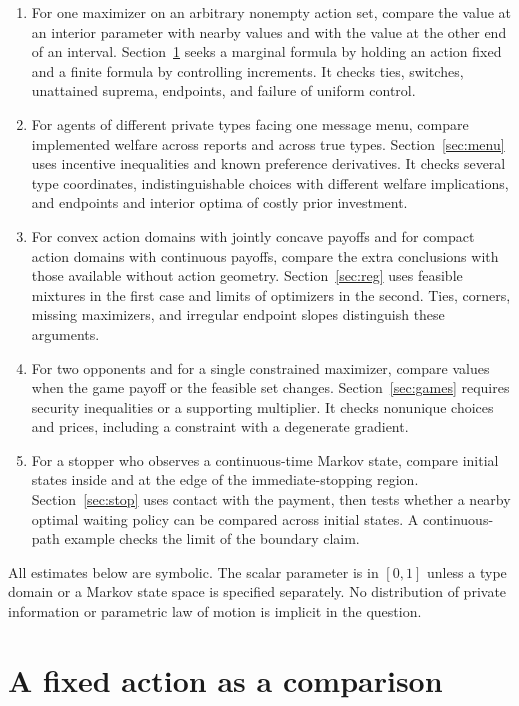 \documentclass[11pt]{article}
\begin{document}
\begin{enumerate}
\item For one maximizer on an arbitrary nonempty action set, compare the value at an interior parameter with nearby values and with the value at the other end of an interval. Section~\ref{sec:base} seeks a marginal formula by holding an action fixed and a finite formula by controlling increments. It checks ties, switches, unattained suprema, endpoints, and failure of uniform control.
\item For agents of different private types facing one message menu, compare implemented welfare across reports and across true types. Section~\ref{sec:menu} uses incentive inequalities and known preference derivatives. It checks several type coordinates, indistinguishable choices with different welfare implications, and endpoints and interior optima of costly prior investment.
\item For convex action domains with jointly concave payoffs and for compact action domains with continuous payoffs, compare the extra conclusions with those available without action geometry. Section~\ref{sec:reg} uses feasible mixtures in the first case and limits of optimizers in the second. Ties, corners, missing maximizers, and irregular endpoint slopes distinguish these arguments.
\item For two opponents and for a single constrained maximizer, compare values when the game payoff or the feasible set changes. Section~\ref{sec:games} requires security inequalities or a supporting multiplier. It checks nonunique choices and prices, including a constraint with a degenerate gradient.
\item For a stopper who observes a continuous-time Markov state, compare initial states inside and at the edge of the immediate-stopping region. Section~\ref{sec:stop} uses contact with the payment, then tests whether a nearby optimal waiting policy can be compared across initial states. A continuous-path example checks the limit of the boundary claim.
\end{enumerate}

All estimates below are symbolic. The scalar parameter is in $[0,1]$ unless a type domain or a Markov state space is specified separately. No distribution of private information or parametric law of motion is implicit in the question.

\section{A fixed action as a comparison}\label{sec:base}
\end{document}
